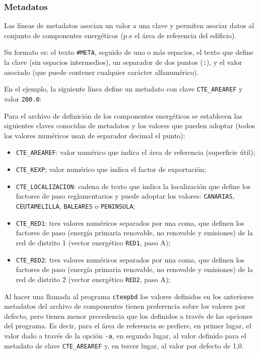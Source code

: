 \documentclass[10pt,notitlepage,oneside,a4paper]{article}
\begin{document}


\subsubsection{Metadatos}

Las líneas de metadatos asocian un valor a una clave y permiten asociar datos al conjunto de componentes energéticos (p.e el área de referencia del edificio).

Su formato es: el texto \texttt{\#META}, seguido de uno o más espacios, el texto que define la clave (sin espacios intermedios), un separador de dos puntos (\texttt{:}), y el valor asociado (que puede contener cualquier carácter alfanumérico).

En el ejemplo, la siguiente línea define un metadato con clave \texttt{CTE\_AREAREF} y valor \texttt{200.0}:



Para el archivo de definición de los componentes energéticos se establecen las siguientes claves conocidas de metadatos y los valores que pueden adoptar (todos los valores numéricos usan de separador decimal el punto):

\begin{itemize}
    \item \texttt{CTE\_AREAREF}: valor numérico que indica el área de referencia (superficie útil);
    \item \texttt{CTE\_KEXP}; valor numérico que indica el factor de exportación;
    \item \texttt{CTE\_LOCALIZACION}: cadena de texto que indica la localización que define los factores de paso reglamentarios y puede adoptar los valores: \texttt{CANARIAS}, \texttt{CEUTAMELILLA}, \texttt{BALEARES} o \texttt{PENINSULA};
    \item \texttt{CTE\_RED1}: tres valores numéricos separados por una coma, que definen los factores de paso (energía primaria renovable, no renovable y emisiones) de la red de distrito 1 (vector energético \texttt{RED1}, paso A);
    \item \texttt{CTE\_RED2}: tres valores numéricos separados por una coma, que definen los factores de paso (energía primaria renovable, no renovable y emisiones) de la red de distrito 2 (vector energético \texttt{RED2}, paso A);
\end{itemize}

Al hacer una llamada al programa \texttt{cteepbd} los valores definidos en los anteriores metadatos del archivo de componentes tienen preferencia sobre los valores por defecto, pero tienen menor precedencia que los definidos a través de las opciones del programa. Es decir, para el área de referencia se prefiere, en primer lugar, el valor dado a través de la opción \texttt{-a}, en segundo lugar, al valor definido para el metadato de clave \texttt{CTE\_AREAREF} y, en tercer lugar, al valor por defecto de 1,0.
\end{document}
